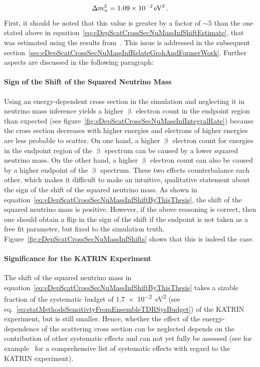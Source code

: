 \begin{equation}
	\label{eq:eDepScatCrossSecNuMassInfShiftByThisThesis}
	\Delta m_\upnu^2 = \SI{1.09e-2}{eV^2}
	\text{\,.}
\end{equation}
First, it should be noted that this value is greater by a factor of $\sim5$ than the one stated above in equation~\eqref{eq:eDepScatCrossSecNuMassInfShiftEstimate}, that was estimated using the results from~\cite{Groh2015}. This issue is addressed in the subsequent section~\ref{sec:eDepScatCrossSecNuMassInfRelateGrohAndFormerWork}. Further aspects are discussed in the following paragraph:

\paragraph{Sign of the Shift of the Squared Neutrino Mass}
Using an energy-dependent cross section in the simulation and neglecting it in neutrino mass inference yields a higher $\upbeta$ electron count in the endpoint region than expected (see figure~\ref{fig:eDepScatCrossSecNuMassInfIntegralRate}) because the cross section decreases with higher energies and electrons of higher energies are less probable to scatter. On one hand, a higher $\upbeta$ electron count for energies in the endpoint region of the $\upbeta$ spectrum can be caused by a lower squared neutrino mass. On the other hand, a higher $\upbeta$ electron count can also be caused by a higher endpoint of the $\upbeta$ spectrum. These two effects counterbalance each other, which makes it difficult to make an intuitive, qualitative statement about the sign of the shift of the squared neutrino mass. As shown in equation~\eqref{eq:eDepScatCrossSecNuMassInfShiftByThisThesis}, the shift of the squared neutrino mass is positive. However, if the above reasoning is correct, then one should obtain a flip in the sign of the shift if the endpoint is not taken as a free fit parameter, but fixed to the simulation truth. Figure~\ref{fig:eDepScatCrossSecNuMassInfShifts} shows that this is indeed the case.

\paragraph{Significance for the KATRIN Experiment}
The shift of the squared neutrino mass in equation~\eqref{eq:eDepScatCrossSecNuMassInfShiftByThisThesis} takes a sizable fraction of the systematic budget of \SI{1.7e-2}{eV^2} (see eq.~\ref{eq:statMethodsSensitivtyFromEnsembleTDRSysBudget}) of the KATRIN experiment, but is still smaller. Hence, whether the effect of the energy-dependence of the scattering cross section can be neglected depends on the contribution of other systematic effects and can not yet fully be assessed (see for example~\cite{SeitzM2019} for a comprehensive list of systematic effects with regard to the KATRIN experiment).

